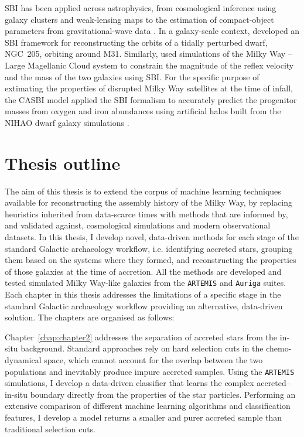 SBI has been applied across astrophysics, from cosmological inference using galaxy clusters and 
weak-lensing maps \citep{HernandezMartinez2024,Jeffrey2021} 
to the estimation of compact-object parameters from gravitational-wave data 
\citep{Green2020}. 
In a galaxy-scale context, \citet{Widmark2025} developed an SBI framework for reconstructing the 
orbits of a tidally perturbed dwarf, NGC~205, orbiting around M31. Similarly, \citet{Brooks2026}
used simulations of the Milky Way -- Large Magellanic Cloud system to constrain the magnitude of 
the reflex velocity and the mass of the two galaxies using SBI. For the specific purpose of extimating the
properties of disrupted Milky Way satellites at the time of infall, the CASBI model \citep{Viterbo2024} 
applied the SBI formalism to accurately predict the  progenitor masses from oxygen and 
iron abundances using artificial halos built from the NIHAO dwarf galaxy simulations \citep{Wang2015,Buck2020}.



\section{Thesis outline}
\label{sec:intro_outline}

The aim of this thesis is to extend the corpus of machine learning techniques available for reconstructing the assembly history 
of the Milky Way, by replacing heuristics inherited from data-scarce times with methods that are informed by, 
and validated against, cosmological simulations and modern observational datasets. 
In this thesis, I develop novel, data-driven methods for each stage of the standard Galactic archaeology workflow, i.e. 
identifying accreted stars, grouping them based on the systems where they formed, and reconstructing the properties of those 
galaxies at the time of accretion. All the methods are developed and tested simulated Milky Way-like galaxies from the \texttt{ARTEMIS} and \texttt{Auriga}
suites. Each chapter in this thesis addresses the limitations of a specific stage in the standard Galactic archaeology workflow providing an 
alternative, data-driven solution. The chapters are organised as follows:

Chapter~\ref{chap:chapter2} addresses the separation of accreted stars 
from the in-situ background. Standard approaches rely on hard selection cuts in the chemo-dynamical space, 
which cannot account for the overlap between the two populations and inevitably produce impure accreted samples. 
Using the \texttt{ARTEMIS} simulations, I develop a data-driven classifier that learns the complex accreted--in-situ 
boundary directly from the properties of the star particles. Performing an extensive comparison of
different machine learning algorithms and classification features, I develop a model returns a smaller and purer accreted sample 
than traditional selection cuts.

